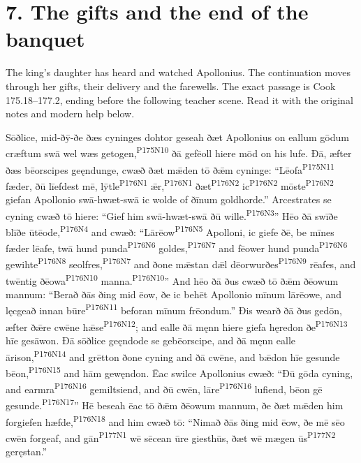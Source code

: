 \section*{7. The gifts and the end of the banquet}

The king’s daughter has heard and watched Apollonius. The continuation moves through her gifts, their delivery and the farewells. The exact passage is Cook 175.18–177.2, ending before the following teacher scene. Read it with the original notes and modern help below.

Sōðlice, mid-ðȳ-ðe ðæs cyninges dohtor geseah ðæt Apollonius on eallum gōdum cræftum swā wel wæs getogen,\textsuperscript{P175N10} ðā gefēoll hiere mōd on his lufe. Ðā, æfter ðæs bēorscipes geęndunge, cwæð ðæt mǣden tō ðǣm cyninge: “Lēofa\textsuperscript{P175N11} fæder, ðū līefdest mē, lȳtle\textsuperscript{P176N1} ǣr,\textsuperscript{P176N1} ðæt\textsuperscript{P176N2} ic\textsuperscript{P176N2} mōste\textsuperscript{P176N2} giefan Apollonio swā-hwæt-swā ic wolde of ðīnum goldhorde.” Arcestrates se cyning cwæð tō hiere: “Gief him swā-hwæt-swā ðū wille.\textsuperscript{P176N3}” Hēo ðā swīðe blīðe ūtēode,\textsuperscript{P176N4} and cwæð: “Lārēow\textsuperscript{P176N5} Apolloni, ic giefe ðē, be mīnes fæder lēafe, twā hund punda\textsuperscript{P176N6} goldes,\textsuperscript{P176N7} and fēower hund punda\textsuperscript{P176N6} gewihte\textsuperscript{P176N8} seolfres,\textsuperscript{P176N7} and ðone mǣstan dǣl dēorwurðes\textsuperscript{P176N9} rēafes, and twēntig ðēowa\textsuperscript{P176N10} manna.\textsuperscript{P176N10}” And hēo ðā ðus cwæð tō ðǣm ðēowum mannum: “Berað ðās ðing mid ēow, ðe ic behēt Apollonio mīnum lārēowe, and lęcgeað innan būre\textsuperscript{P176N11} beforan mīnum frēondum.” Ðis wearð ðā ðus gedōn, æfter ðǣre cwēne hǣse\textsuperscript{P176N12}; and ealle ðā męnn hiere giefa hęredon ðe\textsuperscript{P176N13} hīe gesāwon. Ðā sōðlice geęndode se gebēorscipe, and ðā męnn ealle ārison,\textsuperscript{P176N14} and grētton ðone cyning and ðā cwēne, and bǣdon hīe gesunde bēon,\textsuperscript{P176N15} and hām gewęndon. Ēac swilce Apollonius cwæð: “Ðū gōda cyning, and earmra\textsuperscript{P176N16} gemiltsiend, and ðū cwēn, lāre\textsuperscript{P176N16} lufiend, bēon gē gesunde.\textsuperscript{P176N17}” Hē beseah ēac tō ðǣm ðēowum mannum, ðe ðæt mǣden him forgiefen hæfde,\textsuperscript{P176N18} and him cwæð tō: “Nimað ðās ðing mid ēow, ðe mē sēo cwēn forgeaf, and gān\textsuperscript{P177N1} wē sēcean ūre giesthūs, ðæt wē mægen ūs\textsuperscript{P177N2} geręstan.”

